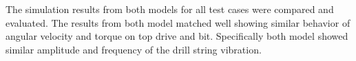 The simulation results from both models for all test cases were compared and evaluated. The results from both model matched well showing similar behavior of angular velocity and torque on top drive and bit. Specifically both model showed similar amplitude and frequency of the drill string vibration. 
